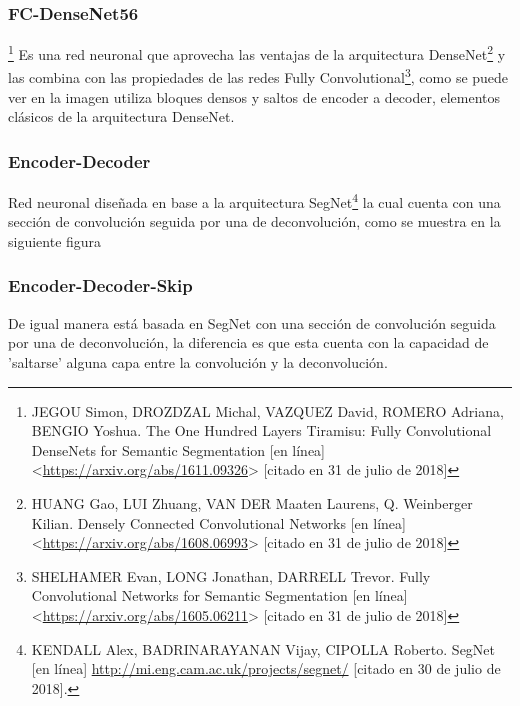 \subsubsection{FC-DenseNet56}\footnote[15]{JEGOU Simon, DROZDZAL Michal, VAZQUEZ David, ROMERO Adriana, BENGIO Yoshua. The One Hundred Layers Tiramisu: Fully Convolutional DenseNets for Semantic Segmentation [en línea] <\url{https://arxiv.org/abs/1611.09326}> [citado en 31 de julio de 2018]} Es una red neuronal que aprovecha las ventajas de la arquitectura DenseNet\footnote[16]{HUANG Gao, LUI Zhuang, VAN DER Maaten Laurens, Q. Weinberger Kilian. Densely Connected Convolutional Networks [en línea] <\url{https://arxiv.org/abs/1608.06993}> [citado en 31 de julio de 2018]} y las combina con las propiedades de las redes Fully Convolutional\footnote[17]{SHELHAMER Evan, LONG Jonathan, DARRELL Trevor. Fully Convolutional Networks for Semantic Segmentation [en línea] <\url{https://arxiv.org/abs/1605.06211}> [citado en 31 de julio de 2018]}, como se puede ver en la imagen utiliza bloques densos y saltos de encoder a decoder, elementos clásicos de la arquitectura DenseNet. 


\subsubsection{Encoder-Decoder} Red neuronal diseñada en base a la arquitectura SegNet\footnote[18]{KENDALL Alex, BADRINARAYANAN Vijay, CIPOLLA Roberto. SegNet [en línea] \url{http://mi.eng.cam.ac.uk/projects/segnet/} [citado en 30 de julio de 2018].} la cual cuenta con una sección de convolución seguida por una de deconvolución, como se muestra en la siguiente figura 


\subsubsection{Encoder-Decoder-Skip} De igual manera está basada en SegNet con una sección de convolución seguida por una de deconvolución, la diferencia es que esta cuenta con la capacidad de 'saltarse' alguna capa entre la convolución y la deconvolución. 

